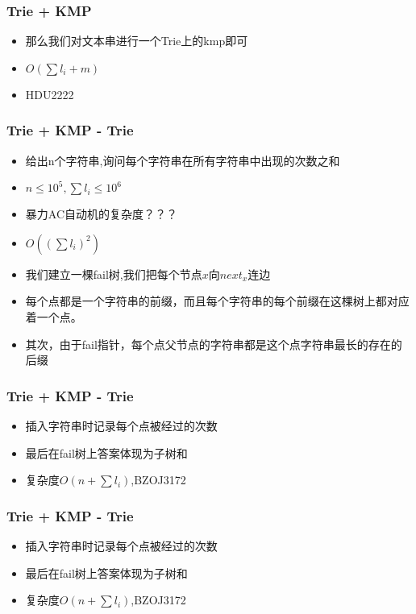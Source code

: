 \documentclass[notheorems]{beamer}
\begin{document}
\begin{frame}
\frametitle{Trie + KMP}
\begin{itemize}[]
\item 那么我们对文本串进行一个Trie上的kmp即可
\item $O(\sum l_i + m)$
\item HDU2222
\end{itemize}
\end{frame}

\begin{frame}
\frametitle{Trie + KMP - Trie}
\begin{itemize}[]
\item 给出n个字符串,询问每个字符串在所有字符串中出现的次数之和
\item $n\leq 10^5,\sum l_i \leq 10^6$
\pause
\item 暴力AC自动机的复杂度？？？
\pause
\item $O((\sum l_i)^2)$
\pause
\item 我们建立一棵fail树,我们把每个节点$x$向$next_x$连边
\pause
\item 每个点都是一个字符串的前缀，而且每个字符串的每个前缀在这棵树上都对应着一个点。
\item 其次，由于fail指针，每个点父节点的字符串都是这个点字符串最长的存在的后缀
\end{itemize}
\end{frame}


\begin{frame}
\frametitle{Trie + KMP - Trie}
\begin{itemize}[]
\item 插入字符串时记录每个点被经过的次数
\item 最后在fail树上答案体现为子树和
\item 复杂度$O(n+\sum l_i)$,BZOJ3172
\end{itemize}
\end{frame}

\begin{frame}
\frametitle{Trie + KMP - Trie}
\begin{itemize}[]
\item 插入字符串时记录每个点被经过的次数
\item 最后在fail树上答案体现为子树和
\item 复杂度$O(n+\sum l_i)$,BZOJ3172
\end{itemize}
\end{frame}
\end{document}
